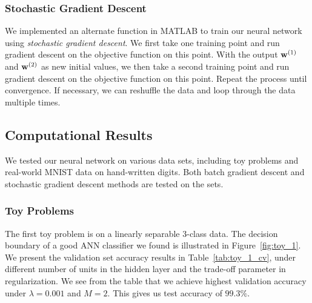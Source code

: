 \subsubsection{Stochastic Gradient Descent}

We implemented an alternate function in MATLAB to train our neural network using \textit{stochastic gradient descent}. We first take one training point and run gradient descent on the objective function on this point. With the output $\boldsymbol{\mathbf{w}}^{(1)}$ and $\boldsymbol{\mathbf{w}}^{(2)}$ as new initial values, we then take a second training point and run gradient descent on the objective function on this point. Repeat the process until convergence. If necessary, we can reshuffle the data and loop through the data multiple times.


\subsection{Computational Results}

We tested our neural network on various data sets, including toy problems and real-world MNIST data on hand-written digits. Both batch gradient descent and stochastic gradient descent methods are tested on the sets. 


\subsubsection{Toy Problems}

The first toy problem is on a linearly separable 3-class data. The decision boundary of a good ANN classifier we found is illustrated in Figure~\ref{fig:toy_1}. We present the validation set accuracy results in Table~\ref{tab:toy_1_cv}, under different number of units in the hidden layer and the trade-off parameter in regularization. We see from the table that we achieve highest validation accuracy under $\lambda = 0.001$ and $M = 2$. This gives us test accuracy of $99.3\%$. 


